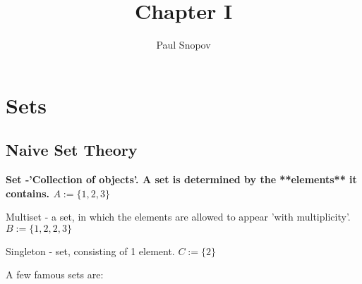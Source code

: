\documentclass{article}
\author{Paul Snopov}
\title{Chapter I}
\begin{document}
\maketitle
\newpage 
\section{Sets}
\subsection{Naive Set Theory}
\bf{Set} -'Collection of objects'. A set is determined by the **elements** it contains. $ A := \{1,2,3\} $

Multiset - a set, in which the elements are allowed to appear 'with multiplicity'. $ B := \{1,2,2,3\} $

Singleton - set, consisting of 1 element. $ C := \{2\} $

A few famous sets are:
\end{document}
